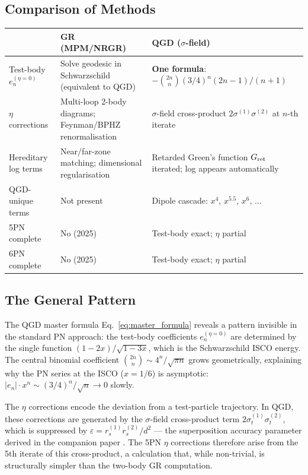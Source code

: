 \documentclass[11pt,a4paper]{article}
\theoremstyle{definition}
\theoremstyle{remark}
\begin{document}
	\subsection{Comparison of Methods}
	
	\begin{center}
		\renewcommand{\arraystretch}{1.6}
		\begin{tabular}{p{4cm}p{5cm}p{5cm}}
			\toprule
			& \textbf{GR (MPM/NRGR)} & \textbf{QGD ($\sigma$-field)} \\
			\midrule
			Test-body $e_n^{(\eta=0)}$ & Solve geodesic in Schwarzschild (equivalent to QGD) & \textbf{One formula}: $-\binom{2n}{n}(3/4)^n(2n-1)/(n+1)$ \\[4pt]
			$\eta$ corrections & Multi-loop 2-body diagrams; Feynman/BPHZ renormalisation & $\sigma$-field cross-product $2\sigma^{(1)}\sigma^{(2)}$ at $n$-th iterate \\[4pt]
			Hereditary log terms & Near/far-zone matching; dimensional regularisation & Retarded Green's function $G_{\rm ret}$ iterated; log appears automatically \\[4pt]
			QGD-unique terms & Not present & Dipole cascade: $x^4$, $x^{5.5}$, $x^6$, $\ldots$ \\[4pt]
			5PN complete & No (2025) & Test-body exact; $\eta$ partial \\[4pt]
			6PN complete & No (2025) & Test-body exact; $\eta$ partial \\
			\bottomrule
		\end{tabular}
	\end{center}
	
	\subsection{The General Pattern}
	
	The QGD master formula Eq.~\eqref{eq:master_formula} reveals a pattern
	invisible in the standard PN approach: the test-body coefficients
	$e_n^{(\eta=0)}$ are determined by the single function
	$(1-2x)/\sqrt{1-3x}$, which is the Schwarzschild ISCO energy.
	The central binomial coefficient $\binom{2n}{n}\sim 4^n/\sqrt{\pi n}$
	grows geometrically, explaining why the PN series at the ISCO ($x=1/6$)
	is asymptotic: $|e_n|\cdot x^n \sim (3/4)^n/\sqrt{n}\to0$ slowly.
	
	The $\eta$ corrections encode the deviation from a test-particle
	trajectory.  In QGD, these corrections are generated by the
	$\sigma$-field cross-product term $2\sigma_t^{(1)}\sigma_t^{(2)}$,
	which is suppressed by $\varepsilon=r_s^{(1)}r_s^{(2)}/d^2$ — the
	superposition accuracy parameter derived in the companion paper
	\cite{QGDSuperposition}.  The 5PN $\eta$ corrections therefore
	arise from the 5th iterate of this cross-product, a calculation
	that, while non-trivial, is structurally simpler than the two-body
	GR computation.
	
\end{document}
